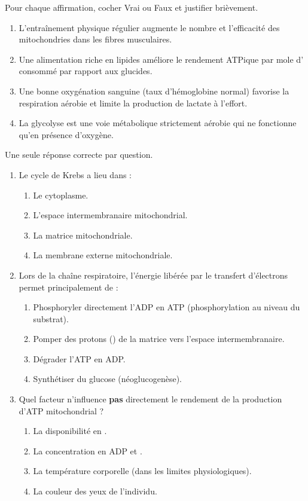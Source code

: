 \documentclass[11pt]{article}
\begin{document}
\begin{exercice}
Pour chaque affirmation, cocher Vrai ou Faux et justifier brièvement.
\begin{enumerate}
    \item L'entraînement physique régulier augmente le nombre et l'efficacité des mitochondries dans les fibres musculaires.
    \item Une alimentation riche en lipides améliore le rendement ATPique par mole d' consommé par rapport aux glucides.
    \item Une bonne oxygénation sanguine (taux d'hémoglobine normal) favorise la respiration aérobie et limite la production de lactate à l'effort.
    \item La glycolyse est une voie métabolique strictement aérobie qui ne fonctionne qu'en présence d'oxygène.
\end{enumerate}
\end{exercice}

\begin{exercice}
Une seule réponse correcte par question.
\begin{enumerate}
    \item Le cycle de Krebs a lieu dans :
    \begin{enumerate}
        \item Le cytoplasme.
        \item L'espace intermembranaire mitochondrial.
        \item La matrice mitochondriale.
        \item La membrane externe mitochondriale.
    \end{enumerate}
    \item Lors de la chaîne respiratoire, l'énergie libérée par le transfert d'électrons permet principalement de :
    \begin{enumerate}
        \item Phosphoryler directement l'ADP en ATP (phosphorylation au niveau du substrat).
        \item Pomper des protons () de la matrice vers l'espace intermembranaire.
        \item Dégrader l'ATP en ADP.
        \item Synthétiser du glucose (néoglucogenèse).
    \end{enumerate}
    \item Quel facteur n'influence \textbf{pas} directement le rendement de la production d'ATP mitochondrial ?
    \begin{enumerate}
        \item La disponibilité en .
        \item La concentration en ADP et .
        \item La température corporelle (dans les limites physiologiques).
        \item La couleur des yeux de l'individu.
    \end{enumerate}
\end{enumerate}
\end{exercice}
\end{document}
